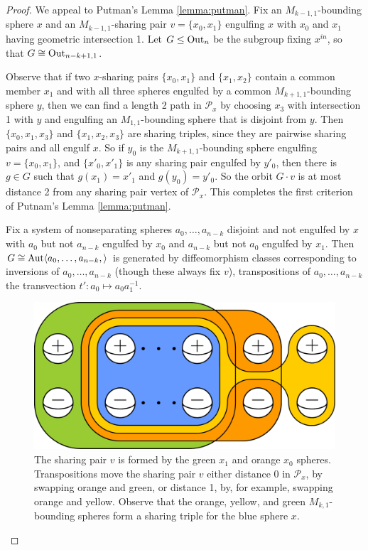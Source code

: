 \begin{proof}
  We appeal to Putman's Lemma \ref{lemma:putman}.
  Fix an $M_{k-1,1}$-bounding sphere $x$ and
  an $M_{k-1,1}$-sharing pair $v=\{x_0,x_1\}$ engulfing $x$ with $x_0$ and $x_1$ having geometric intersection 1.
  Let $G \leq \operatorname{Out}_{n}$ be the subgroup fixing $x^{in}$, so that $G\cong \operatorname{Out}_{n-k+1,1}$.


  Observe that if two $x$-sharing pairs $\{x_0,x_1\}$ and $\{x_1,x_2\}$
  contain a common member $x_1$ and with all three spheres engulfed
  by a common $M_{k+1,1}$-bounding sphere $y$,
  then we can find a length 2 path in $\mathcal P_x$
  by choosing $x_3$ with intersection 1 with $y$
  and engulfing an $M_{1,1}$-bounding sphere that is disjoint from $y$.
  Then $\{x_0,x_1,x_3\}$ and $\{x_1,x_2,x_3\}$ are sharing triples, since
  they are pairwise sharing pairs and all engulf $x$.
  So if $y_0$ is the $M_{k+1,1}$-bounding sphere engulfing $v=\{x_0,x_1\}$,
  and
  $\{x'_0,x'_1\}$ is any sharing pair
  engulfed by $y'_0$,
  then there is $g \in G$ such that $g(x_1)= x'_1$ and $g(y_0) = y'_0$.
  So the orbit $G\cdot v$ is at most distance 2 from any sharing pair vertex of $\mathcal P_x$.
  This completes the first criterion of Putnam's Lemma \ref{lemma:putman}.


  Fix a system of nonseparating spheres
  $a_0, \ldots, a_{n-k}$ disjoint and not engulfed by $x$
  with $a_0$ but not $a_{n-k}$ engulfed by $x_0$ and $a_{n-k}$ but not $a_0$ engulfed by $x_1$.
  Then $G\cong \operatorname{Aut} \langle a_0,\ldots ,a_{n-k}, \rangle $
  is generated by diffeomorphism classes
  corresponding to
  inversions of $a_0, \ldots, a_{n-k}$ (though these always fix $v$),
  transpositions  of $a_0, \ldots, a_{n-k}$
  the transvection $t':a_0 \mapsto a_0a_1^{-1}$.

  \begin{figure}[b!]
    \centering
          \includegraphics[width=.5\textwidth]{figures/ksharepairgraph0.pdf}
          \caption{
          The sharing pair $v$ is formed by the  green $x_1$ and  orange $x_0$ spheres.
          Transpositions move the sharing pair $v$ either distance 0 in $\mathcal P_x$,
          by swapping orange and green, or
          distance 1, by, for example, swapping orange and yellow.
          Observe that the orange, yellow, and green $M_{k,1}$-bounding spheres form a sharing
          triple for the blue sphere $x$.}
          \label{fig:ksharepair0}
  \end{figure}




\end{proof}
